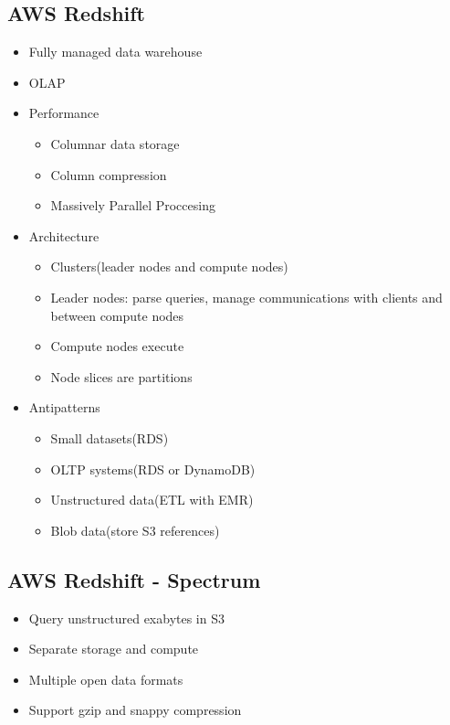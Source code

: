 \documentclass[../main.tex]{subfiles}
\begin{document}
\subsection{AWS Redshift}
\begin{itemize}
    \item Fully managed data warehouse
    \item OLAP
    \item Performance
    \begin{itemize}
        \item Columnar data storage
        \item Column compression
        \item Massively Parallel Proccesing
    \end{itemize}
    \item Architecture
    \begin{itemize}
        \item Clusters(leader nodes and compute nodes)
        \item Leader nodes: parse queries, manage communications with clients and between compute nodes
        \item Compute nodes execute
        \item Node slices are partitions
    \end{itemize}
    \item Antipatterns
    \begin{itemize}
        \item Small datasets(RDS)
        \item OLTP systems(RDS or DynamoDB)
        \item Unstructured data(ETL with EMR)
        \item Blob data(store S3 references)
    \end{itemize}
\end{itemize}

\subsection{AWS Redshift - Spectrum}
\begin{itemize}
    \item Query unstructured exabytes in S3
    \item Separate storage and compute
    \item Multiple open data formats
    \item Support gzip and snappy compression
\end{itemize}
\end{document}

